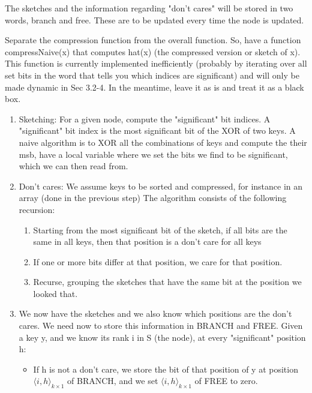 The sketches and the information regarding "don't cares" will be stored in two words, {\ttfamily branch} and {\ttfamily free}. These are to be updated every time the node is updated.

Separate the compression function from the overall function. So, have a function compressNaive(x) that computes hat(x) (the compressed version or sketch of x). This function is currently implemented inefficiently (probably by iterating over all set bits in the word that tells you which indices are significant) and will only be made dynamic in Sec 3.2-4. In the meantime, leave it as is and treat it as a black box.

\begin{enumerate}
    \item
    Sketching:
    For a given node, compute the "significant" bit indices. A "significant" bit index is the most significant bit of the XOR of two keys. A naive algorithm is to XOR all the combinations of keys and compute the their msb, have a local variable where we set the bits we find to be significant, which we can then read from.
    
    \item
    Don't cares:
    We assume keys to be sorted and compressed, for instance in an array (done in the previous step)
    The algorithm consists of the following recursion:
    \begin{enumerate}
        \item
        Starting from the most significant bit of the sketch, if all bits are the same in all keys, then that position is a don't care for all keys
        
        \item
        If one or more bits differ at that position, we care for that position.
        
        \item
        Recurse, grouping the sketches that have the same bit at the position we looked that.
    \end{enumerate}
    
    \item
    We now have the sketches and we also know which positions are the don't cares. We need now to store this information in BRANCH and FREE. Given a key y, and we know its rank i in S (the node), at every "significant" position h:
    \begin{itemize}
        \item
        If h is not a don't care, we store the bit of that position of y at position $\langle i,h\rangle_{k\times1}$ of BRANCH, and we set $\langle i,h\rangle_{k\times1}$ of FREE to zero.
        

\end{itemize}
\end{enumerate}
